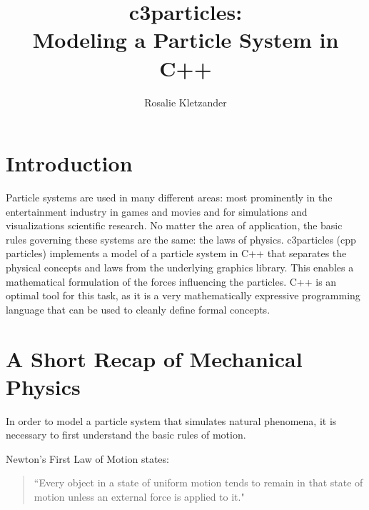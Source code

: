 \documentclass[runningheads,a4paper]{llncs}
\begin{document}
\mainmatter  %

\title{c3particles: \\ Modeling a Particle System in C++}


%
\author{Rosalie Kletzander}
%


\maketitle


\section{Introduction}
Particle systems are used in many different areas: most prominently in the entertainment industry in games and movies and for simulations and visualizations scientific research. No matter the area of application, the basic rules governing these systems are the same: the laws of physics. c3particles (cpp particles) implements a model of a particle system in C++ that separates the physical concepts and laws from the underlying graphics library. This enables a mathematical formulation of the forces influencing the particles. C++ is an optimal tool for this task, as it is a very mathematically expressive programming language that can be used to cleanly define formal concepts.


\section{A Short Recap of Mechanical Physics}

In order to model a particle system that simulates natural phenomena, it is necessary to first understand the basic rules of motion.

Newton's First Law of Motion states:
\begin{quotation}
``Every object in a state of uniform motion tends to remain in that state of motion unless an external force is applied to it." \cite{Newton}
\end{quotation}
\end{document}
